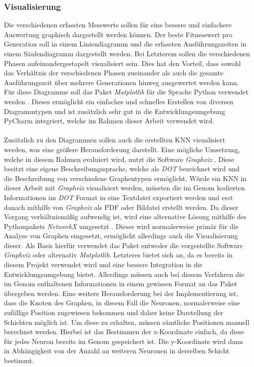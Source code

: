 \subsubsection{Visualisierung}
Die verschiedenen erfassten Messwerte sollen für eine bessere und einfachere Auswertung graphisch dargestellt werden können. Der beste Fitnesswert pro Generation soll in einem Liniendiagramm und die erfassten Ausführungszeiten in einem Säulendiagramm dargestellt werden. Bei Letzterem sollen die verschiedenen Phasen aufeinandergestapelt visualisiert sein. Dies hat den Vorteil, dass sowohl das Verhältnis der verschiedenen Phasen zueinander als auch die gesamte Ausführungszeit über mehrere Generationen hinweg ausgewertet werden kann. Für diese Diagramme soll das Paket \emph{Matplotlib} für die Sprache Python verwendet werden \cite{pyplot2007hunter}. Dieses ermöglicht ein einfaches und schnelles Erstellen von diversen Diagrammtypen und ist zusätzlich sehr gut in die Entwicklungsumgebung PyCharm integriert, welche im Rahmen dieser Arbeit verwendet wird.
\\\\
Zusätzlich zu den Diagrammen sollen auch die erstellten \ac{KNN} visualisiert werden, was eine größere Herausforderung darstellt. Eine mögliche Umsetzung, welche in diesem Rahmen evaluiert wird, nutzt die Software \emph{Graphviz} \cite{graphviz2000gansner}. Diese besitzt eine eigene Beschreibungssprache, welche als \emph{DOT} bezeichnet wird und die Beschreibung von verschiedene Graphentypen ermöglicht. Würde ein \ac{KNN} in dieser Arbeit mit \emph{Graphviz} visualisiert werden, müssten die im  Genom kodierten Informationen im \emph{DOT} Format in eine Textdatei exportiert werden und erst danach mithilfe von \emph{Graphviz} als PDF oder Bildatei erstellt werden. Da dieser Vorgang verhältnismäßig aufwendig ist, wird eine alternative Lösung mithilfe des Pythonpakets \emph{NetworkX} umgesetzt \cite{networkx2008hagberg}. Dieses wird normalerweise primär für die Analyse von Graphen eingesetzt, ermöglicht allerdings auch die Visualisierung dieser. Als Basis hierfür verwendet das Paket entweder die vorgestellte Software \emph{Graphviz} oder alternativ \emph{Matplotlib}. 
Letzteres bietet sich   an, da es bereits in diesem Projekt verwendet wird und eine bessere Integration in die Entwicklungsumgebung bietet. Allerdings müssen auch bei diesem Verfahren die im Genom enthaltenen Informationen in einem gewissen Format an das Paket übergeben werden. Eine weitere Herausforderung bei der Implementierung ist, dass die Knoten des Graphen, in diesem Fall die Neuronen, normalerweise eine zufällige Position zugewiesen bekommen und daher keine Darstellung der Schichten möglich ist. Um diese zu erhalten, müssen sämtliche Positionen manuell berechnet werden. Hierbei ist das Bestimmen der x-Koordinate einfach, da diese für jedes Neuron bereits im Genom gespeichert ist. Die y-Koordinate wird dann in Abhängigkeit von der Anzahl an weiteren Neuronen in derselben Schicht bestimmt.    

